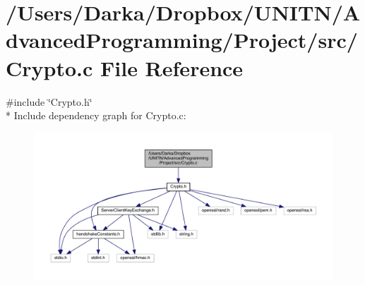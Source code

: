 \section{/\+Users/\+Darka/\+Dropbox/\+U\+N\+I\+T\+N/\+Advanced\+Programming/\+Project/src/\+Crypto.c File Reference}
\label{_crypto_8c}
{\ttfamily \#include \char`\"{}Crypto.\+h\char`\"{}}\\*
Include dependency graph for Crypto.\+c\+:\nopagebreak
\begin{figure}[H]
\begin{center}
\leavevmode
\includegraphics[width=350pt]{_crypto_8c__incl}
\end{center}
\end{figure}
